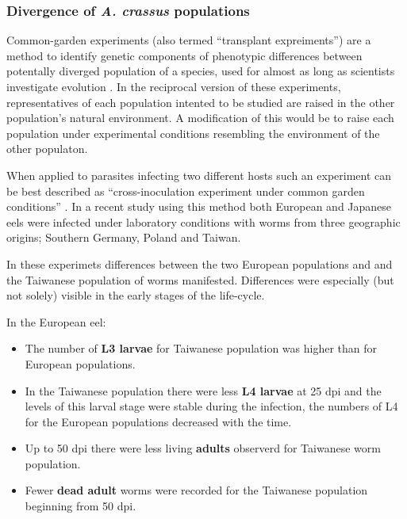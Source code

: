 \subsubsection{Divergence of \textit{A. crassus} populations}
\label{div-ac}

Common-garden experiments (also termed ``transplant expreiments'') are
a method to identify genetic components of phenotypic differences
between potentally diverged population of a species, used for almost
as long as scientists investigate evolution
\cite{kerner_classic_common_garden, bonnier_classic_common_garden}. In
the reciprocal version of these experiments, representatives of each
population intented to be studied are raised in the other population's
natural environment. A modification of this would be to raise each
population under experimental conditions resembling the environment of
the other populaton.

When applied to parasites infecting two different hosts such an
experiment can be best described as ``cross-inoculation experiment
under common garden conditions'' \cite{kaltz_shykoff_rev}. In a recent
study using this method both European and Japanese eels were infected
under laboratory conditions with worms from three geographic origins;
Southern Germany, Poland and Taiwan.



In these experimets differences between the two European populations
and and the Taiwanese population of worms manifested. Differences were
especially (but not solely) visible in the early stages of the
life-cycle.

In the European eel:
\begin{itemize}
\item The number of \textbf{L3 larvae} for Taiwanese population was
  higher than for European populations.
\item In the Taiwanese population there were less \textbf{L4 larvae}
  at 25 dpi and the levels of this larval stage were stable during the
  infection, the numbers of L4 for the European populations decreased
  with the time.
\item Up to 50 dpi there were less living \textbf{adults} observerd
  for Taiwanese worm population.
\item Fewer \textbf{dead adult} worms were recorded for the Taiwanese
  population beginning from 50 dpi.
\end{itemize}

